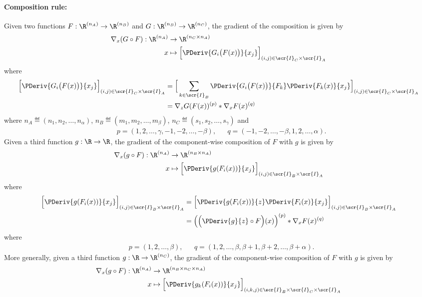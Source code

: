 \documentclass[11pt]{article}
\theoremstyle{remark}
\begin{document}
\paragraph{Composition rule:} Given two functions
$F:\R^{(n_A)}\to\R^{(n_B)}$ and
$G:\R^{(n_B)}\to\R^{(n_C)}$, the gradient of the
composition is given by
\begin{align*}
  \nabla_x (G \circ F):\R^{(n_A)}&\to\R^{(n_C\times n_A)}\\
  x&\mapsto \Big[\PDeriv{G_i\big(F(x)\big)}{x_j}\Big]_{(i,j)\in\scr{I}_C\times\scr{I}_A}
\end{align*}
where
\begin{align*}
  \Big[\PDeriv{G_i\big(F(x)\big)}{x_j}\Big]_{(i,j)\in\scr{I}_C\times\scr{I}_A}
  &= \Big[\sum_{k\in\scr{I}_B}\PDeriv{G_i\big(F(x)\big)}{F_k}\PDeriv{F_k(x)}{x_j}\Big]_{(i,j)\in\scr{I}_C\times\scr{I}_A}\\
  &= \nabla_z G(F(x))^{(p)} * \nabla_x F(x)^{(q)} 
\end{align*}
where $n_A\eqdef(n_1,n_2,\dots,n_\alpha)$, $n_B\eqdef(m_1,m_2,\dots,m_\beta)$,
$n_C\eqdef(s_1,s_2,\dots,s_\gamma)$ and
\begin{align*}
  &p=(1,2,\dots,\gamma,-1,-2,\dots,-\beta), &
  &q=(-1,-2,\dots,-\beta,1,2,\dots,\alpha).
\end{align*}
Given a third function $g:\R\to\R$, the gradient of the component-wise
composition of $F$ with $g$ is given by
\begin{align*}
  \nabla_x (g\circ F):\R^{(n_A)}&\to\R^{(n_B\times n_A)}\\
  x&\mapsto \Big[\PDeriv{g(F_i(x))}{x_j}\Big]_{(i,j)\in\scr{I}_B\times\scr{I}_A}
\end{align*}
where
\begin{align*}
  \Big[\PDeriv{g(F_i(x))}{x_j}\Big]_{(i,j)\in\scr{I}_B\times\scr{I}_A}
  &= \Big[\PDeriv{g(F_i(x))}{z}\PDeriv{F_i(x)}{x_j}\Big]_{(i,j)\in\scr{I}_B\times\scr{I}_A}\\
  &= \Big(\Big(\PDeriv{g}{z} \circ F\Big)(x)\Big)^{(p)} * \nabla_x F(x)^{(q)} 
\end{align*}
where
\begin{align*}
  &p=(1,2,\dots,\beta), &
  &q=(1,2,\dots,\beta,\beta+1,\beta+2,\dots,\beta+\alpha).
\end{align*}
More generally, given a third function $g:\R\to\R^{(n_C)}$, the gradient
of the component-wise composition of $F$ with $g$ is given by
\begin{align*}
  \nabla_x (g\circ F):\R^{(n_A)}&\to\R^{(n_B\times n_C \times n_A)}\\
  x&\mapsto \Big[\PDeriv{g_k(F_i(x))}{x_j}\Big]_{(i,k,j)\in\scr{I}_B\times\scr{I}_C\times\scr{I}_A}
\end{align*}
\end{document}
